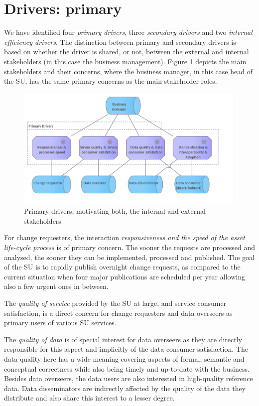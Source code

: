 	\section{Drivers: primary}
	
	We have identified four \textit{primary drivers}, three \textit{secondary drivers} and two \textit{internal efficiency drivers}. The distinction between primary and secondary drivers is based on whether the driver is shared, or not, between the external and internal stakeholders (in this case the business management).
	Figure \ref{fig:primary-drivers} depicts the main stakeholders and their concerns, where the business manager, in this case head of the SU, has the same primary concerns as the main stakeholder roles.
	
	\begin{figure}[h]
		\centering
		\includegraphics[width=0.99\textwidth]{images/motivation/Primary drivers.png}
		\caption{Primary drivers, motivating both, the internal and external stakeholders}
		\label{fig:primary-drivers}
	\end{figure}
	
	For change requesters, the interaction \textit{responsiveness and the speed of the asset life-cycle process} is of primary concern. The sooner the requests are processed and analysed, the sooner they can be implemented, processed and published. The goal of the SU is to rapidly publish overnight change requests, as compared to the current situation when four major publications are scheduled per year allowing also a few urgent ones in between.
	
	The \textit{quality of service} provided by the SU at large, and service consumer satisfaction, is a direct concern for change requesters and data overseers as primary users of various SU services. 
	
	The \textit{quality of data} is of special interest for data overseers as they are directly responsible for this aspect and implicitly of the data consumer satisfaction. The data quality here has a wide meaning covering aspects of formal, semantic and conceptual correctness while also being timely and up-to-date with the business. Besides data overseers, the data users are also interested in high-quality reference data. Data disseminators are indirectly affected by the quality of the data they distribute and also share this interest to a lesser degree. 
	
